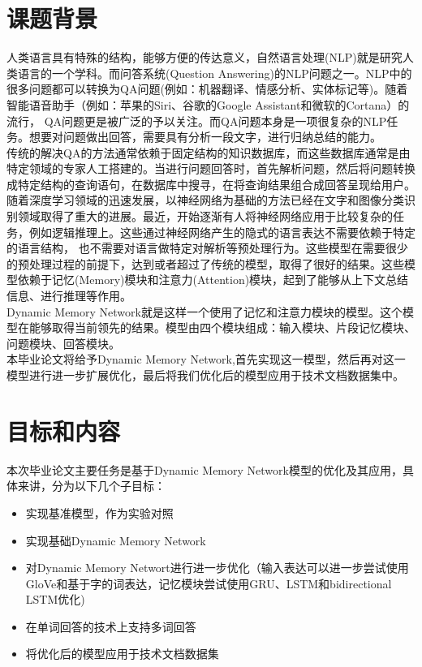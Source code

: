 
\chapter{课题背景}

人类语言具有特殊的结构，能够方便的传达意义，自然语言处理(NLP)就是研究人类语言的一个学科。而问答系统(Question Answering)的NLP问题之一。NLP中的很多问题都可以转换为QA问题(例如：机器翻译、情感分析、实体标记等)。随着智能语音助手（例如：苹果的Siri、谷歌的Google Assistant和微软的Cortana）的流行，
QA问题更是被广泛的予以关注。而QA问题本身是一项很复杂的NLP任务。想要对问题做出回答，需要具有分析一段文字，进行归纳总结的能力。\\
传统的解决QA的方法通常依赖于固定结构的知识数据库，而这些数据库通常是由特定领域的专家人工搭建的。当进行问题回答时，首先解析问题，然后将问题转换成特定结构的查询语句，在数据库中搜寻，在将查询结果组合成回答呈现给用户。\\
随着深度学习领域的迅速发展，以神经网络为基础的方法已经在文字和图像分类识别领域取得了重大的进展。最近，开始逐渐有人将神经网络应用于比较复杂的任务，例如逻辑推理上。这些通过神经网络产生的隐式的语言表达不需要依赖于特定的语言结构，
也不需要对语言做特定对解析等预处理行为。这些模型在需要很少的预处理过程的前提下，达到或者超过了传统的模型，取得了很好的结果。这些模型依赖于记忆(Memory)模块和注意力(Attention)模块，起到了能够从上下文总结信息、进行推理等作用。\\
Dynamic Memory Network就是这样一个使用了记忆和注意力模块的模型。这个模型在能够取得当前领先的结果。模型由四个模块组成：输入模块、片段记忆模块、问题模块、回答模块。\\
本毕业论文将给予Dynamic Memory Network,首先实现这一模型，然后再对这一模型进行进一步扩展优化，最后将我们优化后的模型应用于技术文档数据集中。\\
\chapter{目标和内容}
本次毕业论文主要任务是基于Dynamic Memory Network模型的优化及其应用，具体来讲，分为以下几个子目标：
\begin{itemize}
\item 实现基准模型，作为实验对照
\item 实现基础Dynamic Memory Network
\item 对Dynamic Memory Networt进行进一步优化（输入表达可以进一步尝试使用GloVe和基于字的词表达，记忆模块尝试使用GRU、LSTM和bidirectional LSTM优化)
\item 在单词回答的技术上支持多词回答
\item 将优化后的模型应用于技术文档数据集
\end{itemize} 
